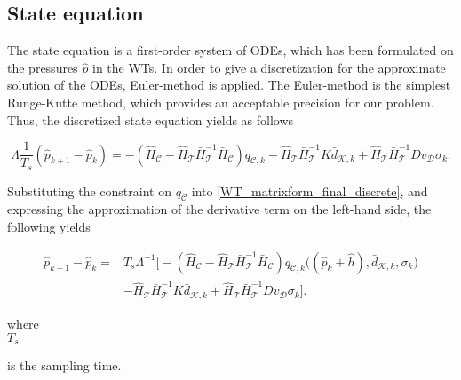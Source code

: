  \subsection{State equation}
\label{state_eq_identification} 

The state equation is a first-order system of ODEs, which has been formulated on the pressures $\hat{p}$ in the WTs. In order to give a discretization for the approximate solution of the ODEs, Euler-method is applied. The Euler-method is the simplest Runge-Kutte method, which provides an acceptable precision for our problem\cite{chicone2006ordinary}. Thus, the discretized state equation yields as follows

\begin{equation}
  \label{WT_matrixform_final_discrete}
\Lambda \frac{1}{T_s} (\hat{p}_{k+1} - \hat{p}_k)  = - (\hat{H}_{\mathcal{C}} - \hat{H}_{\mathcal{T}} \bar{H}^{-1}_{\mathcal{T}}\bar{H}_{\mathcal{C}})  q_{\mathcal{C},k} - \hat{H}_{\mathcal{T}} \bar{H}^{-1}_{\mathcal{T}} K \bar{d}_{\mathcal{K},k} + \hat{H}_{\mathcal{T}} \bar{H}^{-1}_{\mathcal{T}} D v_{\mathcal{D}} \sigma_k.
\end{equation}

Substituting the constraint on $q_{\mathcal{C}}$ into \eqref{WT_matrixform_final_discrete}, and expressing the approximation of the derivative term on the left-hand side, the following yields

\vspace{-4mm}
\begin{align}
\label{WT_matrixform_final_discrete1}
\nonumber  \hat{p}_{k+1} - \hat{p}_k  =& T_s \Lambda^{-1} \big[- (\hat{H}_{\mathcal{C}} - \hat{H}_{\mathcal{T}} \bar{H}^{-1}_{\mathcal{T}}\bar{H}_{\mathcal{C}})  q_{\mathcal{C},k}\big ((\hat{p}_k + \hat{h}),\bar{d}_{\mathcal{K},k}, \sigma_k \big) \\ & - \hat{H}_{\mathcal{T}} \bar{H}^{-1}_{\mathcal{T}} K \bar{d}_{\mathcal{K},k} + \hat{H}_{\mathcal{T}} \bar{H}^{-1}_{\mathcal{T}} D v_{\mathcal{D}} \sigma_k \big].
\end{align}
\vspace{-4mm}

\begin{minipage}[t]{0.20\textwidth}
where\\
\hspace*{8mm} $T_s$
\end{minipage}
\begin{minipage}[t]{0.68\textwidth}
\vspace*{2mm}
 is the sampling time.
\end{minipage}

